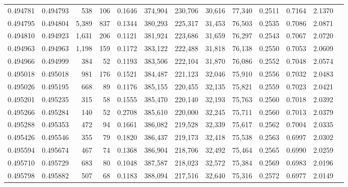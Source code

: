 \begin{tabular}{rrrrrrrrrrrrr}
0.494781 & 0.494793 &   538 &   106 &                                     0.1646 & 374,904 & 230,706 &  30,616 &  77,340 & 0.2511 & 0.7164 & 2.1370 \\
0.494795 & 0.494804 & 5,389 &   837 &                                     0.1344 & 380,293 & 225,317 &  31,453 &  76,503 & 0.2535 & 0.7086 & 2.0871 \\
0.494810 & 0.494923 & 1,631 &   206 &                                     0.1121 & 381,924 & 223,686 &  31,659 &  76,297 & 0.2543 & 0.7067 & 2.0720 \\
0.494963 & 0.494963 & 1,198 &   159 &                                     0.1172 & 383,122 & 222,488 &  31,818 &  76,138 & 0.2550 & 0.7053 & 2.0609 \\
0.494966 & 0.494999 &   384 &    52 &                                     0.1193 & 383,506 & 222,104 &  31,870 &  76,086 & 0.2552 & 0.7048 & 2.0574 \\
0.495018 & 0.495018 &   981 &   176 &                                     0.1521 & 384,487 & 221,123 &  32,046 &  75,910 & 0.2556 & 0.7032 & 2.0483 \\
0.495026 & 0.495195 &   668 &    89 &                                     0.1176 & 385,155 & 220,455 &  32,135 &  75,821 & 0.2559 & 0.7023 & 2.0421 \\
0.495201 & 0.495235 &   315 &    58 &                                     0.1555 & 385,470 & 220,140 &  32,193 &  75,763 & 0.2560 & 0.7018 & 2.0392 \\
0.495266 & 0.495284 &   140 &    52 &                                     0.2708 & 385,610 & 220,000 &  32,245 &  75,711 & 0.2560 & 0.7013 & 2.0379 \\
0.495288 & 0.495353 &   472 &    94 &                                     0.1661 & 386,082 & 219,528 &  32,339 &  75,617 & 0.2562 & 0.7004 & 2.0335 \\
0.495426 & 0.495546 &   355 &    79 &                                     0.1820 & 386,437 & 219,173 &  32,418 &  75,538 & 0.2563 & 0.6997 & 2.0302 \\
0.495594 & 0.495674 &   467 &    74 &                                     0.1368 & 386,904 & 218,706 &  32,492 &  75,464 & 0.2565 & 0.6990 & 2.0259 \\
0.495710 & 0.495729 &   683 &    80 &                                     0.1048 & 387,587 & 218,023 &  32,572 &  75,384 & 0.2569 & 0.6983 & 2.0196 \\
0.495798 & 0.495882 &   507 &    68 &                                     0.1183 & 388,094 & 217,516 &  32,640 &  75,316 & 0.2572 & 0.6977 & 2.0149 \\

\end{tabular}
